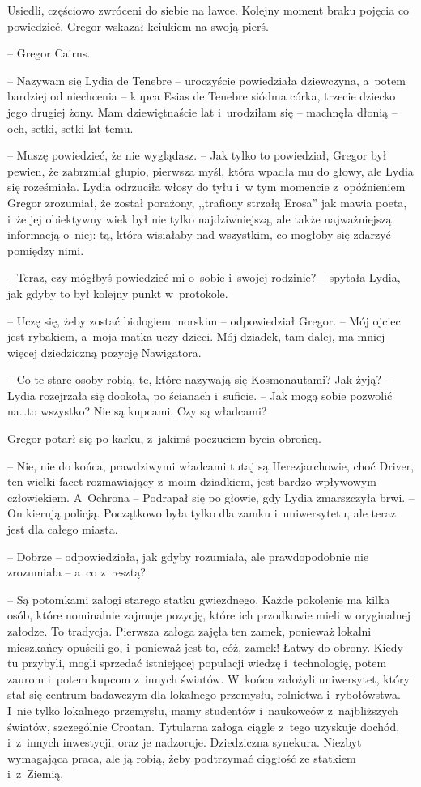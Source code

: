 \documentclass[oneside,polish,12pt,sfheadings]{mwbk}
\begin{document}
Usiedli, częściowo zwróceni do siebie na ławce. Kolejny moment braku
pojęcia co powiedzieć. Gregor wskazał kciukiem na swoją pierś. 

-- Gregor Cairns.

-- Nazywam się Lydia de Tenebre -- uroczyście powiedziała dziewczyna, a~potem bardziej od niechcenia -- kupca Esias de Tenebre siódma córka,
trzecie dziecko jego drugiej żony. Mam dziewiętnaście lat i~urodziłam
się -- machnęła dłonią -- och, setki, setki lat temu.

-- Muszę powiedzieć, że nie wyglądasz. -- Jak tylko to powiedział, Gregor
był pewien, że zabrzmiał głupio, pierwsza myśl, która wpadła mu do
głowy, ale Lydia się roześmiała. Lydia odrzuciła włosy do tyłu i~w tym
momencie z~opóźnieniem Gregor zrozumiał, że został porażony, ,,trafiony
strzałą Erosa'' jak mawia poeta, i~że jej obiektywny wiek był nie tylko
najdziwniejszą, ale także najważniejszą informacją o~niej: tą, która
wisiałaby nad wszystkim, co mogłoby się zdarzyć pomiędzy nimi.

-- Teraz, czy mógłbyś powiedzieć mi o~sobie i~swojej rodzinie? -- spytała
Lydia, jak gdyby to był kolejny punkt w~protokole.

-- Uczę się, żeby zostać biologiem morskim -- odpowiedział Gregor. -- Mój
ojciec jest rybakiem, a~moja matka uczy dzieci. Mój dziadek, tam dalej,
ma mniej więcej dziedziczną pozycję Nawigatora.

-- Co te stare osoby robią, te, które nazywają się Kosmonautami? Jak
żyją? -- Lydia rozejrzała się dookoła, po ścianach i~suficie. -- Jak mogą
sobie pozwolić na\ldots to wszystko? Nie są kupcami. Czy są władcami?

Gregor potarł się po karku, z~jakimś poczuciem bycia obrońcą. 

-- Nie, nie
do końca, prawdziwymi władcami tutaj są Herezjarchowie, choć Driver, ten
wielki facet rozmawiający z~moim dziadkiem, jest bardzo wpływowym
człowiekiem. A~Ochrona --  Podrapał się po głowie, gdy Lydia zmarszczyła brwi. -- On kierują
policją. Początkowo była tylko dla zamku i~uniwersytetu, ale teraz jest
dla całego miasta.

-- Dobrze -- odpowiedziała, jak gdyby rozumiała, ale prawdopodobnie nie
zrozumiała -- a~co z~resztą?

-- Są potomkami załogi starego statku gwiezdnego. Każde pokolenie ma
kilka osób, które nominalnie zajmuje pozycję, które ich przodkowie mieli
w oryginalnej załodze. To tradycja. Pierwsza załoga zajęła ten zamek,
ponieważ lokalni mieszkańcy opuścili go, i~ponieważ jest to, cóż, zamek!
Łatwy do obrony. Kiedy tu przybyli, mogli sprzedać istniejącej populacji
wiedzę i~technologię, potem zaurom i~potem kupcom z~innych światów. W~końcu założyli uniwersytet, który stał się centrum badawczym dla
lokalnego przemysłu, rolnictwa i~rybołówstwa. I~nie tylko lokalnego
przemysłu, mamy studentów i~naukowców z~najbliższych światów,
szczególnie Croatan. Tytularna załoga ciągle z~tego uzyskuje dochód, i~z~innych inwestycji, oraz je nadzoruje. Dziedziczna synekura. Niezbyt
wymagająca praca, ale ją robią, żeby podtrzymać ciągłość ze statkiem i~z~Ziemią.
\end{document}
